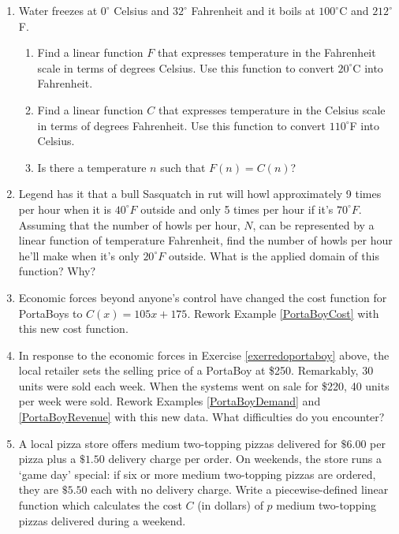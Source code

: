 \begin{enumerate}
\item Water freezes at $0^{\circ}$ Celsius and $32^{\circ}$ Fahrenheit and it boils at $100^{\circ}$C and $212^{\circ}$F.  
\label{celsiustofahr}

\begin{enumerate}

\item Find a linear function $F$ that expresses temperature in the Fahrenheit scale in terms of degrees Celsius.  Use this function to convert $20^{\circ}$C into Fahrenheit.

\item Find a linear function $C$ that expresses temperature in the Celsius scale in terms of degrees Fahrenheit.  Use this function to convert $110^{\circ}$F into Celsius.

\item Is there a temperature $n$ such that $F(n) = C(n)$?

\end{enumerate}

\item Legend has it that a bull Sasquatch in rut will howl approximately 9 times per hour when it is $40^{\circ}F$ outside and only 5 times per hour if it's $70^{\circ}F$.  Assuming that the number of howls per hour, $N$, can be represented by a linear function of temperature Fahrenheit, find the number of howls per hour he'll make when it's only $20^{\circ}F$ outside.  What is the applied domain of this function?  Why?

\item \label{exerredoportaboy} Economic forces beyond anyone's control have changed the cost function for PortaBoys to $C(x) = 105x + 175$.  Rework Example \ref{PortaBoyCost} with this new cost function.

\item In response to the economic forces in Exercise \ref{exerredoportaboy} above, the local retailer sets the selling price of a PortaBoy at \$250.  Remarkably, 30 units were sold each week.  When the systems went on sale for \$220, 40 units per week were sold.  Rework Examples \ref{PortaBoyDemand} and \ref{PortaBoyRevenue} with this new data.  What difficulties do you encounter?

\item A local pizza store offers medium two-topping pizzas delivered for $\$6.00$ per pizza plus a $\$1.50$ delivery charge per order.  On weekends, the store runs a `game day' special:  if six or more medium two-topping pizzas are ordered, they are $\$5.50$ each with no delivery charge.  Write a piecewise-defined linear function which calculates the cost $C$ (in dollars) of  $p$ medium two-topping pizzas delivered during a weekend.


\end{enumerate}
